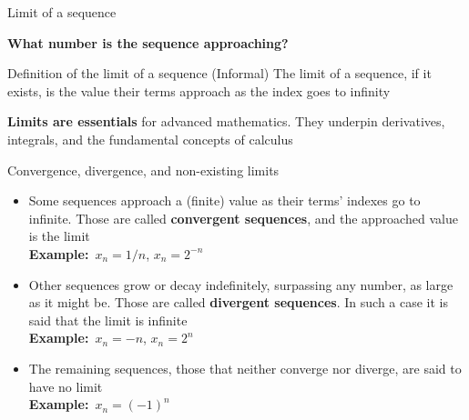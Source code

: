\documentclass[9pt]{beamer}
\begin{document}
\begin{frame}{Limit of a sequence}
\begin{minipage}{0.55\textwidth}
        \textbf{What number is the sequence approaching?}
    \end{minipage}
    \vspace{0.1cm}
    
    \begin{block}{Definition of the limit of a sequence (Informal)}
        The limit of a sequence, if it exists, is the value their terms approach as the index goes to infinity
    \end{block}

    \textbf{Limits are essentials} for advanced mathematics. They underpin derivatives, integrals, and the fundamental concepts of calculus

\end{frame}

\begin{frame}{Convergence, divergence, and non-existing limits}

    \begin{itemize}[leftmargin = 0.5cm, label = $\bullet$, rightmargin = 0.2cm]
    
        \item Some sequences approach a (finite) value as their terms' indexes go to infinite. Those are called \textbf{convergent sequences}, and the approached value is the limit \\

        \textbf{Example:}\ $x_n = 1/n$, \quad $x_n = 2^{-n}$ \\
        \vspace{0.2cm}

        \item Other sequences grow or decay indefinitely, surpassing any number, as large as it might be. Those are called \textbf{divergent sequences}. In such a case it is said that the limit is infinite \\

        \textbf{Example:}\ $x_n = -n$, \quad $x_n = 2^n$ \\
        \vspace{0.2cm}

        \item The remaining sequences, those that neither converge nor diverge, are said to have no limit \\

        \textbf{Example:}\ $x_n = (-1)^n$

    \end{itemize}

\end{frame}
\end{document}
